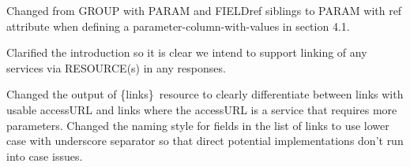 \documentclass[11pt,a4paper]{ivoa}
\newcommand{\blinks}{\{links\}}
\begin{document}
Changed from GROUP with PARAM and FIELDref siblings to PARAM with ref
attribute when defining a parameter-column-with-values in section 4.1.

Clarified the introduction so it is clear we intend to support linking
of any services via RESOURCE(s) in any responses.

Changed the output of \blinks\ resource to clearly differentiate between
links with usable accessURL and links where the accessURL is a service
that requires more parameters. Changed the naming style for fields in
the list of links to use lower case with underscore separator so that
direct potential implementations don't run into case issues.



%
%



\end{document}

